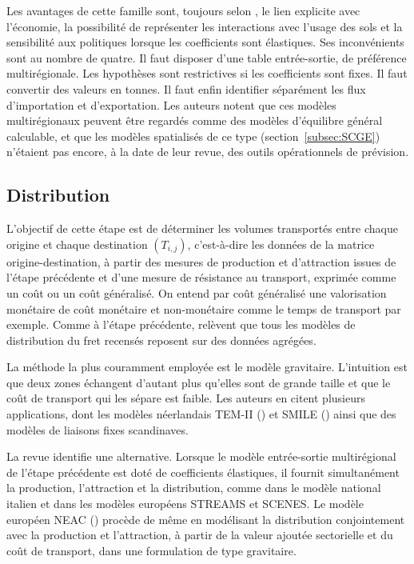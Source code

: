\documentclass[12pt,a4paper,french]{report}
\begin{document}
	Les avantages de cette famille sont, toujours selon \cite{deJong2004}, le lien explicite avec l'économie, la possibilité de représenter les interactions avec l'usage des sols et la sensibilité aux politiques lorsque les coefficients sont élastiques. Ses inconvénients sont au nombre de quatre. Il faut disposer d'une table entrée-sortie, de préférence multirégionale. Les hypothèses sont restrictives si les coefficients sont fixes. Il faut convertir des valeurs en tonnes. Il faut enfin identifier séparément les flux d'importation et d'exportation. Les auteurs notent que ces modèles multirégionaux peuvent être regardés comme des modèles d'équilibre général calculable, et que les modèles spatialisés de ce type (section~\ref{subsec:SCGE}) n'étaient pas encore, à la date de leur revue, des outils opérationnels de prévision.

	\subsection{Distribution}
	\label{subsec:distrib}

	L'objectif de cette étape est de déterminer les volumes transportés entre chaque origine et chaque destination $(T_{i,j})$, c'est-à-dire les données de la matrice origine-destination, à partir des mesures de production et d'attraction issues de l'étape précédente et d'une mesure de résistance au transport, exprimée comme un coût ou un coût généralisé. On entend par coût généralisé une valorisation monétaire de coût monétaire et non-monétaire comme le temps de transport par exemple. Comme à l'étape précédente, \cite{deJong2004} relèvent que tous les modèles de distribution du fret recensés reposent sur des données agrégées.

	La méthode la plus couramment employée est le modèle gravitaire. L'intuition est que deux zones échangent d'autant plus qu'elles sont de grande taille et que le coût de transport qui les sépare est faible. Les auteurs en citent plusieurs applications, dont les modèles néerlandais TEM-II (\cite{Tavasszy1994}) et SMILE (\cite{Tavasszy1998}) ainsi que des modèles de liaisons fixes scandinaves.

	La revue identifie une alternative. Lorsque le modèle entrée-sortie multirégional de l'étape précédente est doté de coefficients élastiques, il fournit simultanément la production, l'attraction et la distribution, comme dans le modèle national italien et dans les modèles européens STREAMS et SCENES. Le modèle européen NEAC (\cite{ChenTardieu2000}) procède de même en modélisant la distribution conjointement avec la production et l'attraction, à partir de la valeur ajoutée sectorielle et du coût de transport, dans une formulation de type gravitaire.
\end{document}
